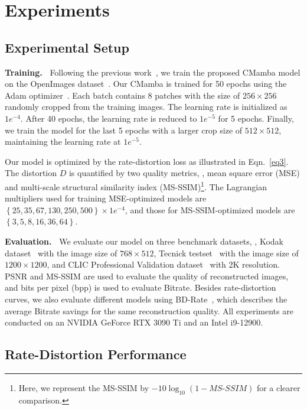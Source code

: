 \section{Experiments}

\subsection{Experimental Setup}


\noindent \textbf{Training.~} 
Following the previous work~\cite{zou2022devil}, we train the proposed CMamba model on the OpenImages dataset~\cite{krasin2017openimages}. 
Our CMamba is trained for 50 epochs using the Adam optimizer~\cite{kingma2014adam}.
Each batch contains 8 patches with the size of $256 \times 256$ randomly cropped from the training images.
The learning rate is initialized as $1e^{-4}$. 
After 40 epochs, the learning rate is reduced to $1e^{-5}$ for 5 epochs. 
Finally, we train the model for the last 5 epochs with a larger crop size of $512 \times 512$, maintaining the learning rate at $1e^{-5}$.


Our model is optimized by the rate-distortion loss as illustrated in Eqn.~\eqref{eq3}.
The distortion $D$ is quantified by two quality metrics, \ie, mean square error (MSE) and multi-scale structural similarity index (MS-SSIM)\footnote[3]{Here, we represent the MS-SSIM by $-10\log_{10}\left( 1-\textit{MS-SSIM} \right)$ for a clearer comparison.}.
The Lagrangian multipliers used for training MSE-optimized models are $\left\{25, 35, 67, 130, 250, 500 \right\}\times1e^{-4}$, and those for MS-SSIM-optimized models are $\left\{3, 5, 8, 16, 36, 64 \right\}$.

\noindent \textbf{Evaluation.~}
We evaluate our model on three benchmark datasets, \ie, Kodak dataset~\cite{franzen1999kodak} with the image size of $768 \times 512$, Tecnick testset~\cite{asuni2014testimages} with the image size of $1200 \times 1200$, and CLIC Professional Validation dataset~\cite{theis2020clic} with 2K resolution. 
PSNR and MS-SSIM are used to evaluate the quality of reconstructed images, and bits per pixel (bpp) is used to evaluate Bitrate.
Besides rate-distortion curves, we also evaluate different models using BD-Rate~\cite{tan2015video}, which describes the average Bitrate savings for the same reconstruction quality.
All experiments are conducted on an NVIDIA GeForce RTX 3090 Ti and an Intel i9-12900.


\subsection{Rate-Distortion Performance}


